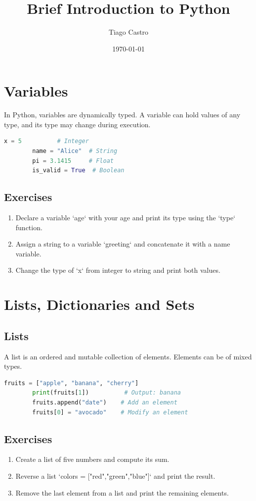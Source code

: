 \documentclass[a4paper,11pt]{article}
\title{Brief Introduction to Python}
\author{Tiago Castro}
\date{\today}
\begin{document}
	
	\maketitle
	
	\section{Variables}
	In Python, variables are dynamically typed. A variable can hold values of any type, and its type may change during execution.
	
	\begin{lstlisting}[language=Python]
		x = 5          # Integer
		name = "Alice"  # String
		pi = 3.1415     # Float
		is_valid = True  # Boolean
	\end{lstlisting}
	
	\subsection*{Exercises}
	\begin{enumerate}
		\item Declare a variable `age` with your age and print its type using the `type` function.
		\item Assign a string to a variable `greeting` and concatenate it with a name variable.
		\item Change the type of `x` from integer to string and print both values.
	\end{enumerate}
	
	\section{Lists, Dictionaries and Sets}
	\subsection{Lists}
	A list is an ordered and mutable collection of elements. Elements can be of mixed types.
	
	\begin{lstlisting}[language=Python]
		fruits = ["apple", "banana", "cherry"]
		print(fruits[1])          # Output: banana
		fruits.append("date")    # Add an element
		fruits[0] = "avocado"    # Modify an element
	\end{lstlisting}
	
	\subsection*{Exercises}
	\begin{enumerate}
		\item Create a list of five numbers and compute its sum.
		\item Reverse a list `colors = ["red","green","blue"]` and print the result.
		\item Remove the last element from a list and print the remaining elements.
	\end{enumerate}
	
\end{document}
